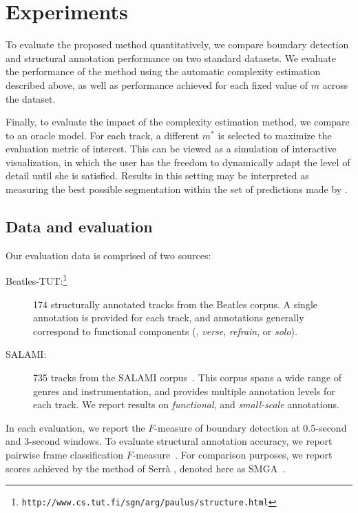 \documentclass{article}
\begin{document}

\section{Experiments}
To evaluate the proposed method quantitatively, we compare boundary detection and
structural annotation performance on two standard datasets.  We evaluate the
performance of the method using the automatic complexity estimation described above,
as well as performance achieved for each fixed value of $m$ across the dataset.

Finally, to evaluate the impact of the complexity estimation method, we compare to an
oracle model. For each track, a different $m^*$ is selected to maximize the
evaluation metric of interest.  This can be viewed as a simulation of interactive
visualization, in which the user has the freedom to dynamically adapt the level of
detail until she is satisfied.  Results in this setting may be interpreted as
measuring the best possible segmentation within the set of predictions made by
.

\subsection{Data and evaluation}
Our evaluation data is comprised of two sources:
\begin{description}
\item[Beatles-TUT:\footnote{\texttt{http://www.cs.tut.fi/sgn/arg/paulus/structure.html}}]
174 structurally annotated tracks from the Beatles corpus.  A single
annotation is provided for each track, and annotations generally correspond to
functional components (\eg, \emph{verse}, \emph{refrain}, or \emph{solo}).
\item[SALAMI:] 735 tracks from the SALAMI corpus~\cite{smith2011design}.  This corpus
spans a wide range of genres and instrumentation, and provides multiple
annotation levels for each track.  We report results on \emph{functional},
and \emph{small-scale} annotations.
\end{description}

In each evaluation, we report the $F$-measure of boundary detection at 0.5-second and
3-second windows.  To evaluate structural annotation accuracy, we report pairwise frame 
classification $F$-measure~\cite{levy2008structural}.  
For comparison purposes, we report scores achieved by the method of 
Serr\`{a} \etal, denoted here as SMGA~\cite{serra2014unsupervised}.
\end{document}
